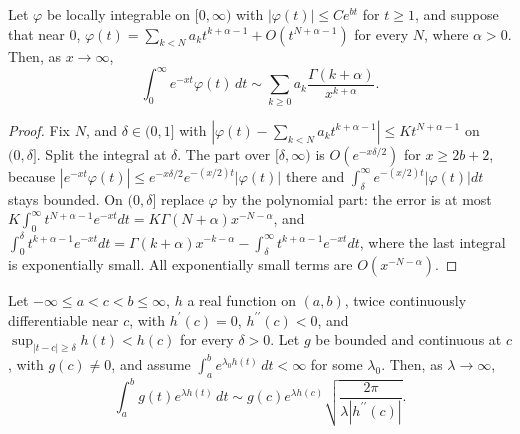 \begin{theorem}\label{special-functions:theorem-watson}
Let $\varphi$ be locally integrable on $[0, \infty)$ with $|\varphi(t)| \leq Ce^{bt}$ for $t \geq 1$, and suppose that near $0$, $\varphi(t) = \sum_{k<N}a_kt^{k+\alpha-1} + O(t^{N+\alpha-1})$ for every $N$, where $\alpha > 0$.
Then, as $x \to \infty$,
\[
\int_0^\infty e^{-xt}\varphi(t)\,dt \sim \sum_{k \geq 0}a_k\frac{\Gamma(k + \alpha)}{x^{k+\alpha}}.
\]
\end{theorem}

\begin{proof}
Fix $N$, and $\delta \in (0, 1]$ with $|\varphi(t) - \sum_{k<N}a_kt^{k+\alpha-1}| \leq Kt^{N+\alpha-1}$ on $(0, \delta]$. Split the integral at $\delta$. The part over $[\delta, \infty)$ is $O(e^{-x\delta/2})$ for $x \geq 2b + 2$, because
$|e^{-xt}\varphi(t)| \leq e^{-x\delta/2}e^{-(x/2)t}|\varphi(t)|$ there and $\int_\delta^\infty e^{-(x/2)t}|\varphi(t)|dt$ stays bounded. On $(0, \delta]$ replace $\varphi$ by the polynomial part: the error is at most
$K\int_0^\infty t^{N+\alpha-1}e^{-xt}dt = K\Gamma(N + \alpha)x^{-N-\alpha}$, and $\int_0^\delta t^{k+\alpha-1}e^{-xt}dt = \Gamma(k + \alpha)x^{-k-\alpha} - \int_\delta^\infty t^{k+\alpha-1}e^{-xt}dt$, where the last integral is exponentially small. All
exponentially small terms are $O(x^{-N-\alpha})$.
\end{proof}

\begin{theorem}\label{special-functions:theorem-laplace}
Let $-\infty \leq a < c < b \leq \infty$, $h$ a real function on $(a, b)$, twice continuously differentiable near $c$, with $h^{\prime}(c) = 0$, $h^{\prime\prime}(c) < 0$, and $\sup_{|t - c| \geq \delta}h(t) < h(c)$ for every
$\delta > 0$. Let $g$ be bounded and continuous at $c$, with $g(c) \neq 0$, and assume $\int_a^be^{\lambda_0h(t)}\,dt < \infty$ for some $\lambda_0$. Then, as $\lambda \to \infty$,
\[
\int_a^bg(t)e^{\lambda h(t)}\,dt \sim g(c)e^{\lambda h(c)}\sqrt{\frac{2\pi}{\lambda|h^{\prime\prime}(c)|}}.
\]
\end{theorem}

